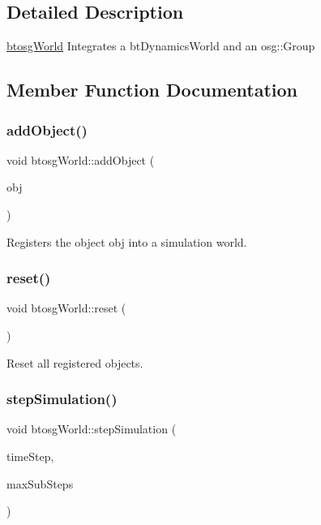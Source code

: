 \subsection{Detailed Description}
\hyperlink{classbtosgWorld}{btosg\+World} Integrates a bt\+Dynamics\+World and an osg\+::\+Group 

\subsection{Member Function Documentation}
\mbox{\label{classbtosgWorld_ae5b71c6319dd420479096a265a1725b7}} 
\subsubsection{\texorpdfstring{add\+Object()}{addObject()}}
{\footnotesize\ttfamily void btosg\+World\+::add\+Object (\begin{DoxyParamCaption}\item[{class \hyperlink{classbtosgObject}{btosg\+Object} $\ast$}]{obj }\end{DoxyParamCaption})}

Registers the object obj into a simulation world. \mbox{\label{classbtosgWorld_a6af4d066410a86b44fff5563667ea9a9}} 
\subsubsection{\texorpdfstring{reset()}{reset()}}
{\footnotesize\ttfamily void btosg\+World\+::reset (\begin{DoxyParamCaption}{ }\end{DoxyParamCaption})}

Reset all registered objects. \mbox{\label{classbtosgWorld_afce096686d8f84afd8b8fa3f2dc161b8}} 
\subsubsection{\texorpdfstring{step\+Simulation()}{stepSimulation()}}
{\footnotesize\ttfamily void btosg\+World\+::step\+Simulation (\begin{DoxyParamCaption}\item[{bt\+Scalar}]{time\+Step,  }\item[{int}]{max\+Sub\+Steps }\end{DoxyParamCaption})}

